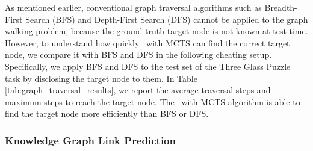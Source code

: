 As mentioned earlier, conventional graph traversal algorithms such as Breadth-First Search (BFS) and Depth-First Search (DFS) cannot be applied to the graph walking problem, because the ground truth target node is not known at test time. However, to understand how quickly \modelname~with MCTS can find the correct target node, we compare it with BFS and DFS in the following cheating setup. Specifically, we apply BFS and DFS to the test set of the Three Glass Puzzle task by disclosing the target node to them. In Table \ref{tab:graph_traversal_results}, we report the average traversal steps and maximum steps to reach the target node. The \modelname~with MCTS algorithm is able to find the target node more efficiently than BFS or DFS.
	
	
	
	
	
	
	
	
\subsubsection{Knowledge Graph Link Prediction}
\label{Appendix:kbc}



